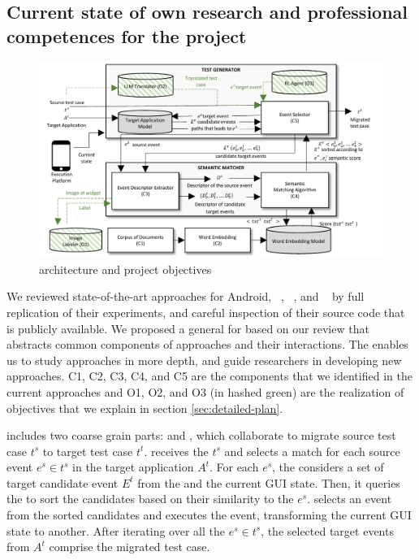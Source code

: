 	
\subsection{Current state of own research and professional competences for the project}
\label{sec:own-research}

\begin{figure}[h]
	\centering
	\includegraphics[width=\textwidth]{images/architecture.pdf}
	\caption{\testreuse architecture and project objectives}
	\label{fig:architecture}
\end{figure}

We reviewed state-of-the-art \testreuse approaches for Android, \atm~\cite{behrang:apptestmigrator:ASE:2019}, \craftdroid~\cite{lin:craftdroid:ASE:2019}, and \adaptdroid~\cite{Mariani:Adaptdroid:AST:2021} by full replication of their experiments, and careful inspection of their source code that is publicly available.
We proposed a general \architecture for \testreuse based on our review that abstracts common components of \testreuse approaches and their interactions. 
The \architecture enables us to study \testreuse approaches in more depth, and guide researchers in developing new approaches.
C1, C2, C3, C4, and C5 are the components that we identified in the current approaches and O1, O2, and O3 (in hashed green) are the realization of \project objectives that we explain in section \ref{sec:detailed-plan}. 


\smallskip 
\testreuse  includes two coarse grain parts: \generator and \matcher, which collaborate to migrate source test case $t^s$ to target test case $t^t$.
\generator receives the $t^s$ and selects a match for each source event $e^s \in t^s$ in the target application $A^t$.
For each $e^s$, the \generator considers a set of target candidate event $E^t$ from the \tam and the current GUI state. 
Then, it queries the \matcher to sort the candidates based on their similarity to the $e^s$.
\generator selects an event from the sorted candidates and executes the event, transforming the current GUI state to another. 
After iterating over all the $e^s \in t^s$, the selected target events from $A^t$ comprise the migrated test case.



